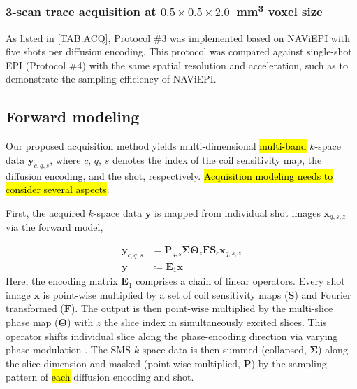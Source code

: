 \documentclass[preprint,12pt,authoryear,review]{elsarticle}
\begin{document}
    \subsubsection{3-scan trace acquisition at $0.5\times0.5\times2.0$~\si{\cubic\milli\meter} voxel size}

    As listed in \cref{TAB:ACQ},
    Protocol \#3 was implemented based on
    NAViEPI with five shots per diffusion encoding.
    This protocol was compared against single-shot EPI (Protocol \#4)
    with the same spatial resolution and acceleration,
    such as to demonstrate the sampling efficiency of NAViEPI.


    \subsection{Forward modeling}
    Our proposed acquisition method yields
    multi-dimensional \hl{multi-band} 
    $k$-space data $\mathbf{y}_{c,q,s}$,
    where $c$, $q$, $s$ denotes the index of the coil sensitivity map,
    the diffusion encoding, and the shot, respectively.
    \hl{Acquisition modeling needs to consider several aspects}.

    First, the acquired $k$-space data $\mathbf{y}$ is mapped from
    individual shot images $\mathbf{x}_{q,s,z}$ via the forward model,

    \begin{align}
        \mathbf{y}_{c,q,s} &= \mathbf{P}_{q,s} \mathbf{\Sigma} \mathbf{\Theta}_{z} \mathbf{F} \mathbf{S}_c \mathbf{x}_{q,s,z} \nonumber \\
        \mathbf{y} &\coloneqq \mathbf{E}_1 \mathbf{x} \label{EQU:model_shot}
    \end{align}
    Here, the encoding matrix $\mathbf{E}_1$ comprises
    a chain of linear operators.
    Every shot image $\mathbf{x}$ is point-wise multiplied
    by a set of coil sensitivity maps ($\mathbf{S}$) and Fourier transformed ($\mathbf{F}$).
    The output is then point-wise multiplied by the multi-slice phase map ($\mathbf{\Theta}$)
    with $z$ the slice index in simultaneously excited slices.
    This operator shifts individual slice
    along the phase-encoding direction
    via varying phase modulation \citep{breuer_2005_caipi}.
    The SMS $k$-space data is then
    summed (collapsed, $\mathbf{\Sigma}$) along the slice dimension and
    masked (point-wise multiplied, $\mathbf{P}$) by
    the sampling pattern of \hl{each} diffusion encoding and shot.
\end{document}
